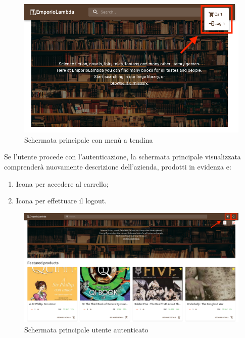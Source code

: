 \begin{figure}[H]
	\centering
	\includegraphics[scale=0.4]{Immagini/Acquirente/home-mobile-open.customer.png}
	\caption{Schermata principale con menù a tendina}
	\label{fig:Homeicone}
\end{figure}
Se l'utente procede con l'autenticazione, la schermata principale visualizzata comprenderà nuovamente descrizione dell'azienda, prodotti in evidenza e:
\begin{enumerate}
	\item Icona per accedere al carrello;
	\item Icona per effettuare il logout. 
\end{enumerate} 
\begin{figure}[H]
	\centering
	\includegraphics[scale=0.25]{Immagini/Acquirente/home.customer.png}
	\caption{Schermata principale utente autenticato}
	\label{fig:Homecustomer}
\end{figure}
